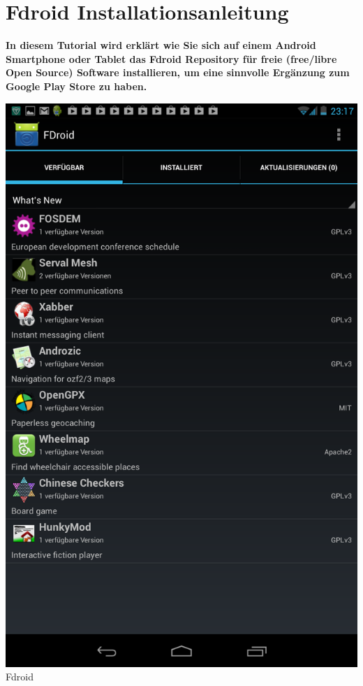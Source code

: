 \section*{Fdroid Installationsanleitung}
\label{fdroid}

\textbf{In diesem Tutorial wird erklärt wie Sie sich auf einem Android Smartphone oder Tablet das Fdroid Repository für freie (free/libre Open Source) Software installieren, um eine sinnvolle Ergänzung zum Google Play Store zu haben.}

\begin{center}
\includegraphics[width=\linewidth]{fdroid/fdroid2.png} \\
\footnotesize{Fdroid}
\end{center}
